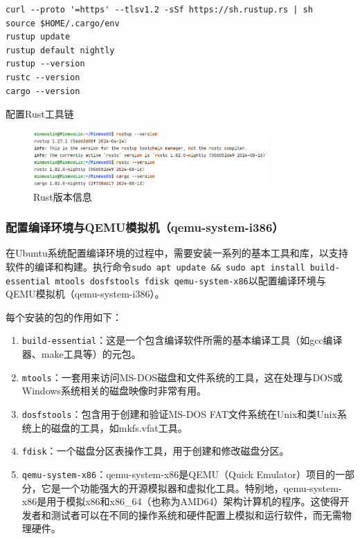 \begin{enumerate}
\begin{enumerate}
          \end{enumerate}
          \begin{listing}[htbp]
              \begin{verbatim}
curl --proto '=https' --tlsv1.2 -sSf https://sh.rustup.rs | sh
source $HOME/.cargo/env
rustup update
rustup default nightly
rustup --version
rustc --version
cargo --version
              \end{verbatim}
              \caption{配置Rust工具链}\label{lst:ConfigureRust}
          \end{listing}
          \begin{figure}[htbp]
              \centering
              \includegraphics[width=0.8\textwidth]{figures/RustVersion.png}
              \caption{Rust版本信息}
              \label{fig:RustVersion}
          \end{figure}
\end{enumerate}

\subsubsection{配置编译环境与QEMU模拟机（qemu-system-i386）}

在Ubuntu系统配置编译环境的过程中，需要安装一系列的基本工具和库，以支持软件的编译和构建。执行命令\texttt{sudo apt update \&\& sudo apt install build-essential mtools dosfstools fdisk qemu-system-x86}以配置编译环境与QEMU模拟机（qemu-system-i386）。

每个安装的包的作用如下：

\begin{enumerate}
    \item \texttt{build-essential}：这是一个包含编译软件所需的基本编译工具（如gcc编译器、make工具等）的元包。
    \item \texttt{mtools}：一套用来访问MS-DOS磁盘和文件系统的工具，这在处理与DOS或Windows系统相关的磁盘映像时非常有用。
    \item \texttt{dosfstools}：包含用于创建和验证MS-DOS FAT文件系统在Unix和类Unix系统上的磁盘的工具，如mkfs.vfat工具。
    \item \texttt{fdisk}：一个磁盘分区表操作工具，用于创建和修改磁盘分区。
    \item \texttt{qemu-system-x86}：qemu-system-x86是QEMU（Quick Emulator）项目的一部分，它是一个功能强大的开源模拟器和虚拟化工具。特别地，qemu-system-x86是用于模拟x86和x86\_64（也称为AMD64）架构计算机的程序。这使得开发者和测试者可以在不同的操作系统和硬件配置上模拟和运行软件，而无需物理硬件。
\end{enumerate}

